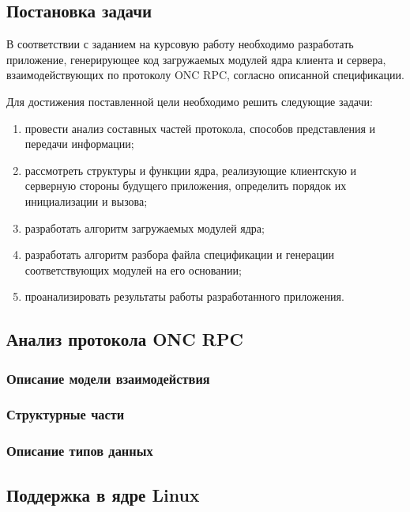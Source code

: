 
\vspace{-1\baselineskip}

\subsection{Постановка задачи}

В соответствии с заданием на курсовую работу необходимо разработать приложение,
генерирующее код загружаемых модулей ядра клиента и сервера, взаимодействующих
по протоколу ONC RPC, согласно описанной спецификации.

Для достижения поставленной цели необходимо решить следующие задачи:
\begin{enumerate}
    \item провести анализ составных частей протокола, способов представления и
          передачи информации;
    \item рассмотреть структуры и функции ядра, реализующие клиентскую и
          серверную стороны будущего приложения, определить порядок их
          инициализации и вызова;
    \item разработать алгоритм загружаемых модулей ядра;
    \item разработать алгоритм разбора файла спецификации и генерации
          соответствующих модулей на его основании;
    \item проанализировать результаты работы разработанного приложения.
\end{enumerate}

\subsection{Анализ протокола ONC RPC}

\subsubsection{Описание модели взаимодействия}

\subsubsection{Структурные части}

\subsubsection{Описание типов данных}

\subsection{Поддержка в ядре Linux}

